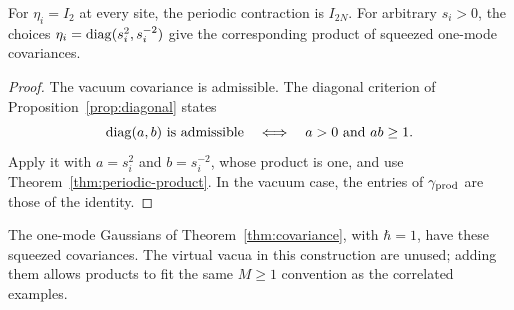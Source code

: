 \begin{corollary}\label{cor:product-examples}
For $\eta_i=I_2$ at every site, the periodic contraction is $I_{2N}$.
For arbitrary $s_i>0$, the choices
$\eta_i=\operatorname{diag}(s_i^2,s_i^{-2})$ give the corresponding product of squeezed
one-mode covariances.
\end{corollary}
\begin{proof}
The vacuum covariance is admissible. The diagonal criterion of
Proposition~\ref{prop:diagonal} states
\[
 \diag(a,b)\text{ is admissible}\quad\Longleftrightarrow\quad a>0\ \text{and}\ ab\geq1.
\]
Apply it with $a=s_i^2$ and $b=s_i^{-2}$, whose product is one, and use
Theorem~\ref{thm:periodic-product}. In the vacuum case, the entries of
$\gamma_{\rm prod}$ are those of the identity.
\end{proof}
The one-mode Gaussians of Theorem~\ref{thm:covariance}, with $\hbar=1$, have
these squeezed covariances. The virtual vacua in this construction are unused;
adding them allows products to fit the same $M\geq1$ convention as the correlated
examples.
